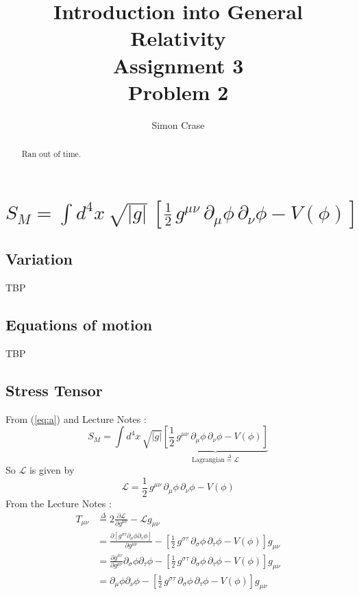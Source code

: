 \documentclass[]{article}
\title{Introduction into General Relativity\\Assignment 3\\Problem 2}
\author{Simon Crase}
\newcommand{\Lagr}{\mathscr{L}}
\begin{document}
\maketitle
\thispagestyle{fancy}

\begin{abstract}
Ran out of time.
\end{abstract}


 

\section{$S_M = \int d^4x \, \sqrt{|g|} \, \left[\frac12 \, g^{\mu\nu} \, \partial_\mu \phi \, \partial_\nu \phi - V(\phi)\right]$}
\subsection{Variation}
TBP
\subsection{Equations of motion}
TBP
\subsection{Stress Tensor} \label{subseq:StressTensor}
From (\ref{eq:a}) and Lecture Notes \cite[Lecture III, Section 3]{akhmedev2016}:
\begin{equation}
S_M = \int d^4x \, \sqrt{|g|} \underbrace{\left[\frac12 \, g^{\mu\nu} \, \partial_\mu \phi \, \partial_\nu \phi - V(\phi)\right]}_{\text{Lagrangian}\overset{\Delta}{=}\Lagr}
\end{equation}
So $\Lagr$ is given by
\begin{equation}
\Lagr=\frac12 \, g^{\mu\nu} \, \partial_\mu \phi \, \partial_\nu \phi - V(\phi)
\end{equation}
From the Lecture Notes \cite[(64)]{akhmedev2016}:
\begin{align}
T_{\mu\nu}&\overset{\Delta}{=}2 \frac{\partial \Lagr}{\partial g^{\mu\nu}} - \Lagr g_{\mu\nu} \nonumber \\
&=\frac{\partial [g^{\sigma\tau}\partial_\sigma \phi \partial_\tau \phi]}{\partial g^{\mu\nu}}-[\frac12 \, g^{\sigma\tau} \, \partial_\sigma \phi \, \partial_\tau \phi - V(\phi)] g_{\mu\nu} \nonumber \\
&=\frac{\partial g^{\sigma\tau}}{\partial g^{\mu\nu}}\partial_\sigma \phi \partial_\tau \phi-[\frac12 \, g^{\sigma\tau} \, \partial_\sigma \phi \, \partial_\tau \phi - V(\phi)] g_{\mu\nu} \nonumber \\
&=\partial_\mu \phi \partial_\nu \phi - [\frac12 \, g^{\sigma\tau} \, \partial_\sigma \phi \, \partial_\tau \phi - V(\phi)] g_{\mu\nu} 
\end{align}
\end{document}
